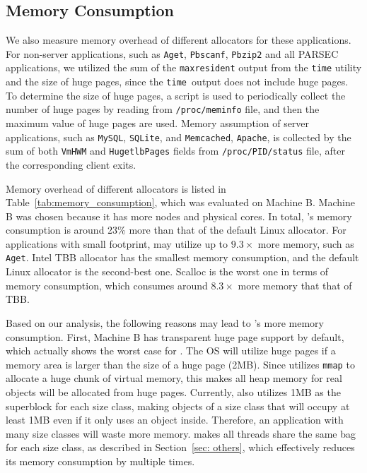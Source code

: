 \subsection{Memory Consumption}
\label{sec:memory}

We also measure memory overhead of different allocators for these applications. For non-server applications, such as \texttt{Aget}, \texttt{Pbscanf}, \texttt{Pbzip2} and all PARSEC applications, we utilized the sum of the \texttt{maxresident} output from the \texttt{time} utility and the size of huge pages, since the \texttt{time }output does not include huge pages. To determine the size of huge pages, a script is used to periodically collect the number of huge pages by reading from \texttt{/proc/meminfo} file, and then the maximum value of huge pages are used. Memory assumption of server applications, such as \texttt{MySQL}, \texttt{SQLite}, and \texttt{Memcached}, \texttt{Apache}, is collected by the sum of both \texttt{VmHWM} and \texttt{HugetlbPages} fields from \texttt{/proc/PID/status} file, after the corresponding client exits. 




Memory overhead of different allocators is listed in Table~\ref{tab:memory_consumption}, which was evaluated on Machine B. Machine B was chosen because it has more nodes and physical cores. In total, \NM{}'s memory consumption is around 23\% more than that of the default Linux allocator. For applications with small footprint, \NM{} may utilize up to $9.3\times$ more memory, such as \texttt{Aget}. Intel TBB allocator has the smallest memory consumption, and the default Linux allocator is the second-best one. Scalloc is the worst one in terms of memory consumption, which consumes around  $8.3\times$ more memory that that of TBB.  
 
  Based on our analysis, the following reasons may lead to \NM{}'s more memory consumption. First, Machine B has transparent huge page support by default, which actually shows the worst case for \NM{}. The OS will utilize huge pages if a memory area is larger than the size of a huge page (2MB). Since \NM{} utilizes \texttt{mmap} to allocate a huge chunk of virtual memory, this makes all heap memory for real objects will be allocated from huge pages. Currently, \NM{} also utilizes 1MB as the superblock for each size class, making objects of a size class that will occupy at least 1MB even if it only uses an object inside. Therefore, an application with many size classes will waste more memory. \NM{} makes all threads share the same bag for each size class, as described in Section~\ref{sec: others}, which effectively reduces its memory consumption by multiple times. 
 
